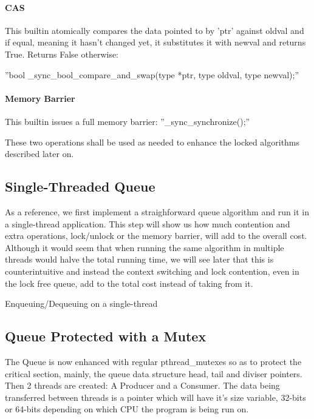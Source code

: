 \documentclass{article}
\begin{document}
\paragraph{CAS}
This builtin atomically compares the data pointed to by 'ptr' against oldval and if equal, meaning it hasn't changed yet, it substitutes it with newval and returns True. Returns False otherwise: \,

	''bool \_sync\_bool\_compare\_and\_swap(type *ptr, type oldval, type newval);''
\paragraph{Memory Barrier}
This builtin issues a full memory barrier: ''\_sync\_synchronize();'' \,

These two operations shall be used as needed to enhance the locked algorithms described later on.

\subsection{Single-Threaded Queue}

As a reference, we first implement a straighforward queue algorithm and run it in a single-thread application. This step will show us how much contention and extra operations, lock/unlock or the memory barrier, will add to the overall cost. Although it would seem that when running the same algorithm in multiple threads would halve the total running time, we will see later that this is counterintuitive and instead the context switching and lock contention, even in the lock free queue, add to the total cost instead of taking from it.

\begin{algorithm}[htp]
\DontPrintSemicolon
{}
\caption{Enqueuing/Dequeuing on a single-thread}
\label{alg:mine}
\end{algorithm}

\subsection{Queue Protected with a Mutex}
The Queue is now enhanced with regular pthread\_mutexes so as to protect the critical section, mainly, the queue data structure head, tail and diviser pointers. Then 2 threads are created: A Producer and a Consumer. The data being transferred between threads is a pointer which will have it's size variable, 32-bits or 64-bits depending on which CPU the program is being run on.
\end{document}
